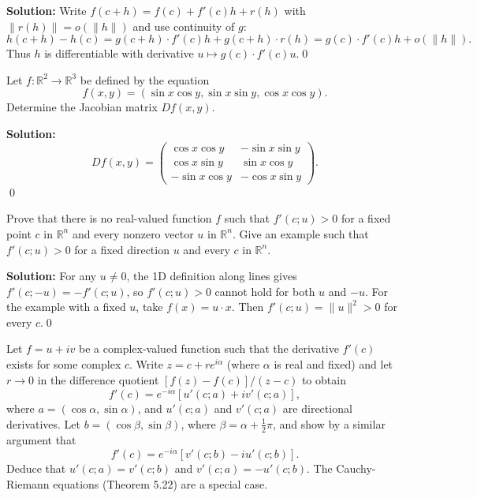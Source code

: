 \noindent\textbf{Solution:}
Write $f(c+h)=f(c)+f'(c)h+r(h)$ with $\|r(h)\|=o(\|h\|)$ and use continuity of $g$:
\[h(c+h)-h(c)=g(c+h)\cdot f'(c)h+g(c+h)\cdot r(h)=g(c)\cdot f'(c)h+o(\|h\|).\]
Thus $h$ is differentiable with derivative $u\mapsto g(c)\cdot f'(c)u$.\qed


\begin{problembox}
Let \( f : \mathbb{R}^2 \to \mathbb{R}^3 \) be defined by the equation
\[f(x, y) = (\sin x \cos y, \sin x \sin y, \cos x \cos y).\]
Determine the Jacobian matrix \( Df(x, y) \).
\end{problembox}

\noindent\textbf{Solution:}
\[Df(x,y)=\begin{pmatrix}
\cos x\cos y & -\sin x\sin y\\
\cos x\sin y & \sin x\cos y\\
-\sin x\cos y & -\cos x\sin y
\end{pmatrix}.\]\qed


\begin{problembox}
Prove that there is no real-valued function \( f \) such that \( f'(c; u) > 0 \) for a fixed point \( c \) in \( \mathbb{R}^n \) and every nonzero vector \( u \) in \( \mathbb{R}^n \). Give an example such that \( f'(c; u) > 0 \) for a fixed direction \( u \) and every \( c \) in \( \mathbb{R}^n \).
\end{problembox}

\noindent\textbf{Solution:}
For any $u\ne0$, the 1D definition along lines gives $f'(c;-u)=-f'(c;u)$, so $f'(c;u)>0$ cannot hold for both $u$ and $-u$. For the example with a fixed $u$, take $f(x)=u\cdot x$. Then $f'(c;u)=\|u\|^2>0$ for every $c$.\qed


\begin{problembox}
Let \( f = u + iv \) be a complex-valued function such that the derivative \( f'(c) \) exists for some complex \( c \). Write \( z = c + re^{i\alpha} \) (where \( \alpha \) is real and fixed) and let \( r \to 0 \) in the difference quotient \( [f(z) - f(c)]/(z - c) \) to obtain
\[f'(c) = e^{-i\alpha}[u'(c; a) + iv'(c; a)],\]
where \( a = (\cos \alpha, \sin \alpha) \), and \( u'(c; a) \) and \( v'(c; a) \) are directional derivatives. Let \( b = (\cos \beta, \sin \beta) \), where \( \beta = \alpha + \frac{1}{2}\pi \), and show by a similar argument that
\[f'(c) = e^{-i\alpha}[v'(c; b) - iu'(c; b)].\]
Deduce that \( u'(c; a) = v'(c; b) \) and \( v'(c; a) = -u'(c; b) \). The Cauchy-Riemann equations (Theorem 5.22) are a special case.
\end{problembox}


